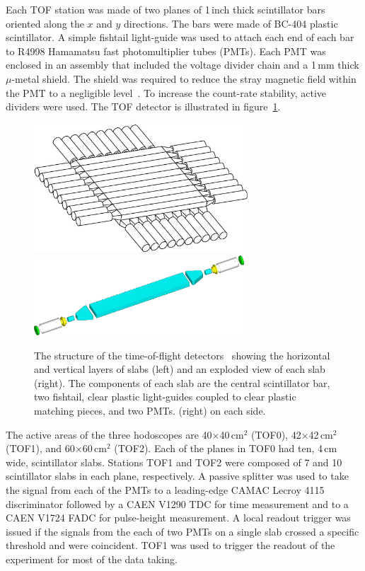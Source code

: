 Each TOF station was made of two planes of 1\,inch thick scintillator
bars oriented along the $x$ and $y$ directions. 
The bars were made of BC-404 plastic scintillator.
A simple fishtail light-guide was used to attach each end of each bar
to R4998 Hamamatsu fast photomultiplier tubes (PMTs).
Each PMT was enclosed in an assembly that included the voltage divider
chain and a 1\,mm thick $\mu$-metal shield.
The shield was required to reduce the stray magnetic field within the
PMT to a negligible level~\cite{2010NIMPA.615...14B}.
To increase the count-rate stability, active dividers were used.
The TOF detector is illustrated in figure~\ref{fig:tof:schematic}.
\begin{figure}[!htb]
  \begin{center}
    \includegraphics[width=8cm]{tof_diagram2}
    \includegraphics[height=3cm]{slab_design2}
  \end{center}
  \caption{
    The structure of the time-of-flight
    detectors~\cite{2010NIMPA.615...14B,NOTE145} showing the
    horizontal and vertical layers of slabs (left) and an exploded
    view of each slab (right). 
    The components of each slab are the central scintillator bar, two
    fishtail, clear plastic light-guides coupled to clear plastic
    matching pieces, and two PMTs.
    (right) on each side.
  }
  \label{fig:tof:schematic}
\end{figure}

The active areas of the three hodoscopes are 40$\times$40\,cm$^2$
(TOF0), 42$\times$42\,cm$^2$ (TOF1), and 60$\times$60\,cm$^2$ (TOF2).
Each of the planes in TOF0 had ten, 4\,cm wide, scintillator slabs.
Stations TOF1 and TOF2 were composed of 7 and 10 scintillator slabs in
each plane, respectively.
A passive splitter was used to take the signal from each of the PMTs
to a leading-edge CAMAC Lecroy 4115 discriminator followed by a CAEN
V1290 TDC for time measurement and to a CAEN V1724 FADC for
pulse-height measurement.
A local readout trigger was issued if the signals from the each of two
PMTs on a single slab crossed a specific threshold and were
coincident.
TOF1 was used to trigger the readout of the experiment for most of the
data taking. \\

